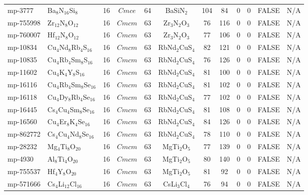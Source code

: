 {\begin{longtable}{llcccccccccc}
    mp-3777 & Ba$_{8}$N$_{16}$Si$_{8}$ & 16    & $Cmce$ & 64    & BaSiN$_{2}$ & 104   & 84    & 0     & 0     & FALSE & N/A \\
    mp-755998 & Zr$_{12}$N$_{8}$O$_{12}$ & 16    & $Cmcm$ & 63    & Zr$_{3}$N$_{2}$O$_{3}$ & 76    & 116   & 0     & 0     & FALSE & N/A \\
    mp-760007 & Hf$_{12}$N$_{8}$O$_{12}$ & 16    & $Cmcm$ & 63    & Zr$_{3}$N$_{2}$O$_{3}$ & 77    & 106   & 0     & 0     & FALSE & N/A \\
    mp-10834 & Cu$_{4}$Nd$_{8}$Rb$_{4}$S$_{16}$ & 16    & $Cmcm$ & 63    & RbNd$_{2}$CuS$_{4}$ & 82    & 121   & 0     & 0     & FALSE & N/A \\
    mp-10835 & Cu$_{4}$Rb$_{4}$Sm$_{8}$S$_{16}$ & 16    & $Cmcm$ & 63    & RbNd$_{2}$CuS$_{4}$ & 76    & 126   & 0     & 0     & FALSE & N/A \\
    mp-11602 & Cu$_{4}$K$_{4}$Y$_{8}$S$_{16}$ & 16    & $Cmcm$ & 63    & RbNd$_{2}$CuS$_{4}$ & 81    & 100   & 0     & 0     & FALSE & N/A \\
    mp-16116 & Cu$_{4}$Rb$_{4}$Sm$_{8}$Se$_{16}$ & 16    & $Cmcm$ & 63    & RbNd$_{2}$CuS$_{4}$ & 81    & 102   & 0     & 0     & FALSE & N/A \\
    mp-16118 & Cu$_{4}$Dy$_{8}$Rb$_{4}$Se$_{16}$ & 16    & $Cmcm$ & 63    & RbNd$_{2}$CuS$_{4}$ & 77    & 102   & 0     & 0     & FALSE & N/A \\
    mp-16445 & Cs$_{4}$Cu$_{4}$Sm$_{8}$Se$_{16}$ & 16    & $Cmcm$ & 63    & RbNd$_{2}$CuS$_{4}$ & 81    & 108   & 0     & 0     & FALSE & N/A \\
    mp-16560 & Cu$_{4}$Er$_{8}$K$_{4}$Se$_{16}$ & 16    & $Cmcm$ & 63    & RbNd$_{2}$CuS$_{4}$ & 84    & 126   & 0     & 0     & FALSE & N/A \\
    mp-862772 & Cs$_{4}$Cu$_{4}$Nd$_{8}$Se$_{16}$ & 16    & $Cmcm$ & 63    & RbNd$_{2}$CuS$_{4}$ & 78    & 110   & 0     & 0     & FALSE & N/A \\
    mp-28232 & Mg$_{4}$Ti$_{8}$O$_{20}$ & 16    & $Cmcm$ & 63    & MgTi$_{2}$O$_{5}$ & 77    & 139   & 0     & 0     & FALSE & N/A \\
    mp-4930 & Al$_{8}$Ti$_{4}$O$_{20}$ & 16    & $Cmcm$ & 63    & MgTi$_{2}$O$_{5}$ & 80    & 140   & 0     & 0     & FALSE & N/A \\
    mp-755537 & Hf$_{4}$Y$_{8}$O$_{20}$ & 16    & $Cmcm$ & 63    & MgTi$_{2}$O$_{5}$ & 81    & 92    & 0     & 0     & FALSE & N/A \\
    mp-571666 & Cs$_{4}$Li$_{12}$Cl$_{16}$ & 16    & $Cmcm$ & 63    & CsLi$_{3}$Cl$_{4}$ & 76    & 94    & 0     & 0     & FALSE & N/A \\

\end{longtable}}
